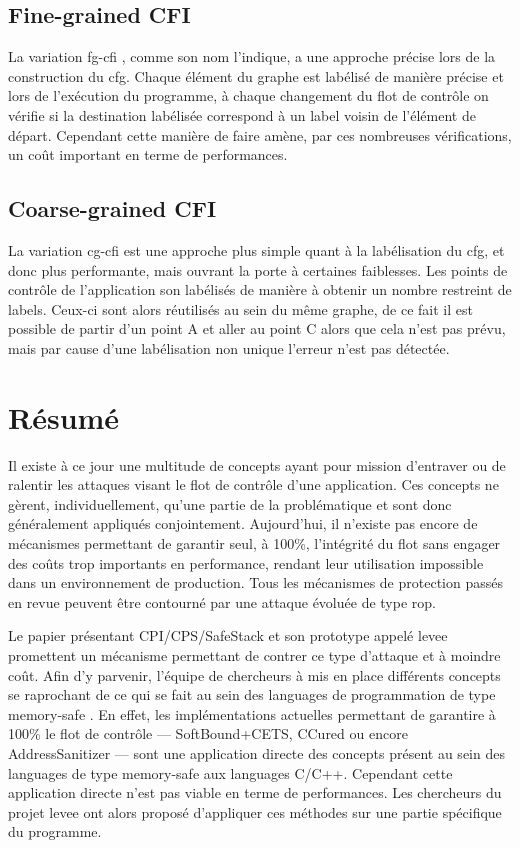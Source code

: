 \subsection{\og Fine-grained CFI \fg}

La variation \og \gls{fg-cfi} \fg \cite{FineCFI, FineCFIKernel}, comme son nom l'indique, a une approche précise lors de la construction du \gls{cfg}. Chaque élément du graphe est labélisé de manière précise et lors de l'exécution du programme, à chaque changement du flot de contrôle on vérifie si la destination labélisée correspond à un label voisin de l'élément de départ. Cependant cette manière de faire amène, par ces nombreuses vérifications, un coût important en terme de performances.

\subsection{\og Coarse-grained CFI \fg}

La variation \og \gls{cg-cfi} \fg est une approche plus simple quant à la labélisation du \gls{cfg},  et donc plus performante, mais ouvrant la porte à certaines faiblesses. Les points de contrôle de l'application son labélisés de manière à obtenir un nombre restreint de labels. Ceux-ci sont alors réutilisés au sein du même graphe, de ce fait il est possible de partir d'un point A et aller au point C alors que cela n'est pas prévu, mais par cause d'une labélisation non unique l'erreur n'est pas détectée.

\newpage

\section{Résumé}

Il existe à ce jour une multitude de concepts ayant pour mission d'entraver ou de ralentir les attaques visant le flot de contrôle d'une application. Ces concepts ne gèrent, individuellement, qu'une partie de la problématique et sont donc généralement appliqués conjointement. Aujourd'hui, il n'existe pas encore de mécanismes permettant de garantir seul, à 100\%, l'intégrité du flot sans engager des coûts trop importants en performance, rendant leur utilisation impossible dans un environnement de production. Tous les mécanismes de protection passés en revue peuvent être contourné par une attaque évoluée de type \gls{rop}.

Le papier présentant CPI/CPS/SafeStack \cite{CPIPaper} et son prototype appelé \gls{levee} promettent un mécanisme permettant de contrer ce type d'attaque et à moindre coût. Afin d'y parvenir, l'équipe de chercheurs à mis en place différents concepts se raprochant de ce qui se fait au sein des languages de programmation de type \og memory-safe \fg. En effet, les implémentations actuelles permettant de garantire à 100\% le flot de contrôle --- SoftBound+CETS, CCured ou encore AddressSanitizer --- sont une application directe des concepts présent au sein des languages de type \og memory-safe \fg aux languages C/C++. Cependant cette application directe n'est pas viable en terme de performances. Les chercheurs du projet \gls{levee} ont alors proposé d'appliquer ces méthodes sur une partie spécifique du programme.

